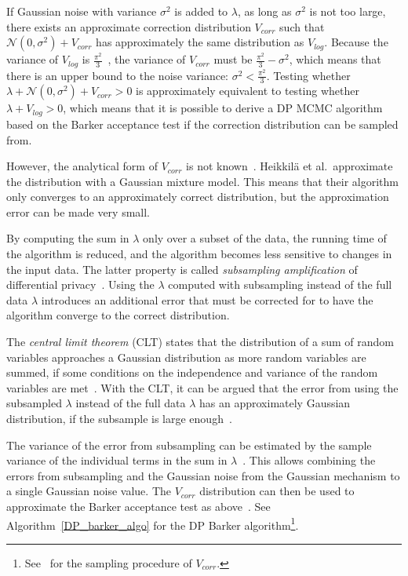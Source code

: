 \documentclass[english,twoside,openright]{HYgraduMLDS}
\newcommand{\caln}{{\mathcal{N}}}
\begin{document}
If Gaussian noise with variance \(\sigma^2\) is added to 
\(\lambda\), as long as \(\sigma^{2}\) is not too large, there exists an
approximate correction
distribution \(V_{corr}\) such that \(\caln(0, \sigma^2) + V_{corr}\) has
approximately the same distribution as \(V_{log}\). Because the variance of
\(V_{log}\) is
\(\frac{\pi^2}{3}\)~\cite{HeikkilaJDH19}, the variance of \(V_{corr}\) must be 
\(\frac{\pi^2}{3} - \sigma^2\), which means that there is an upper bound
to the noise variance: \(\sigma^2 < \frac{\pi^2}{3}\). Testing whether 
\(\lambda + \caln(0, \sigma^2) + V_{corr} > 0\) is approximately equivalent
to testing 
whether \(\lambda + V_{log} > 0\), which means that it is possible to derive 
a DP MCMC algorithm based on the Barker acceptance test if the correction 
distribution can be sampled from.

However, the analytical form of \(V_{corr}\) is not known~\cite{HeikkilaJDH19}.
Heikkilä et al.\  approximate the distribution with a Gaussian mixture model.
This means that their 
algorithm only converges to an approximately correct distribution, but the 
approximation error can be made very small.

By computing the sum in \(\lambda\) only over a subset of the data, the
running time of the algorithm is reduced, and the algorithm becomes less
sensitive to changes in the input data.
The latter property is called \emph{subsampling amplification}
of differential privacy~\cite{WangBK19}. Using the \(\lambda\) computed 
with subsampling instead of the full data \(\lambda\) introduces an additional 
error that must be corrected for to have the algorithm converge to the correct 
distribution. 

The \emph{central limit theorem} (CLT) states that the distribution of a sum 
of random variables approaches a Gaussian distribution as more random variables 
are summed, if some conditions on the independence and variance of the random 
variables are met~\cite{SPC17}. With the CLT, it can be argued
that the error from 
using the subsampled \(\lambda\) instead of the full data \(\lambda\) has an 
approximately Gaussian distribution, if the subsample is large 
enough~\cite{SPC17}.

The variance of the error from subsampling can 
be estimated by the sample variance of the individual terms in the sum in 
\(\lambda\)~\cite{SPC17}. This allows combining the errors from subsampling and the
Gaussian noise from the Gaussian mechanism to a single Gaussian noise value.
The \(V_{corr}\) distribution can then be used to approximate the Barker acceptance 
test as above~\cite{HeikkilaJDH19}. See Algorithm~\ref{DP_barker_algo} for the DP Barker
algorithm\footnote{
    See~\cite{HeikkilaJDH19} for the sampling procedure of \(V_{corr}\).
}.
\end{document}
